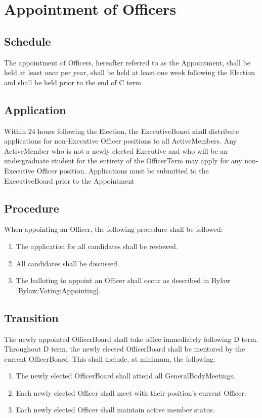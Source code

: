 \chapter{Appointment of Officers}\label{Bylaw:OfficerBoardAppointment}

\section{Schedule}\label{chap:OfficerBoardAppointmentSchedule}
	The appointment of \glspl{Officer}, hereafter referred to as the \gls{Appointment}, shall be held at least once per year, shall be held at least one week following the \gls{Election} and shall be held prior to the end of C term.

\section{Application}\label{chap:OfficerBoardAppointmentApplication}
	Within 24 hours following the \gls{Election}, the \gls{ExecutiveBoard} shall distribute applications for non-\gls{Executive} \gls{Officer} positions to all \glspl{ActiveMember}. Any \gls{ActiveMember} who is not a newly elected \gls{Executive} and who will be an undergraduate student for the entirety of the \gls{OfficerTerm} may apply for any non-\gls{Executive} \gls{Officer} position. Applications must be submitted to the \gls{ExecutiveBoard} prior to the \gls{Appointment}

\section{Procedure}\label{Bylaw:OfficerBoardAppointment:Procedure}
	When appointing an \gls{Officer}, the following procedure shall be followed:
	\begin{enumerate}
		\item{The application for all candidates shall be reviewed.}
		\item{All candidates shall be discussed.}
		\item{The balloting to appoint an \gls{Officer} shall occur as described in \Gls{Bylaw} \ref{Bylaw:Voting:Appointing}.}
	\end{enumerate}

\section{Transition}\label{chap:OfficerBoardAppointmentTransistions}
    The newly appointed \gls{OfficerBoard} shall take office immediately following D term. Throughout D term, the newly elected \gls{OfficerBoard} shall be mentored by the current \gls{OfficerBoard}. This shall include, at minimum, the following:
    \begin{enumerate}
        \item{The newly elected \gls{OfficerBoard} shall attend all \glspl{GeneralBodyMeeting}.}
        \item{Each newly elected \gls{Officer} shall meet with their position's current \gls{Officer}.}
        \item{Each newly elected \gls{Officer} shall maintain active member status.}
    \end{enumerate}